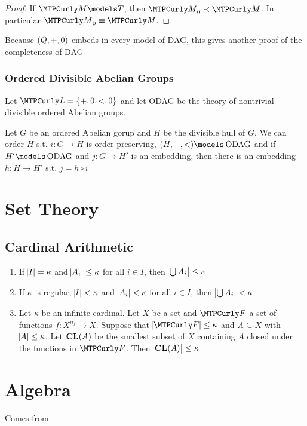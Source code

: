 \documentclass[11pt]{article}
\begin{document}
\begin{proof}
If \(\calm\models T\), then \(\calm_0\prec \calm\). In particular
\(\calm_0\equiv\calm\).
\end{proof}

Because \((\relax{Q},+,0)\) embeds in every model of DAG, this gives another proof
of the completeness of DAG

\subsubsection{Ordered Divisible Abelian Groups}
\label{sec:orga60839b}
Let \(\call=\{+,0,<,0\}\) and let ODAG be the theory of nontrivial divisible
ordered Abelian groups.

\begin{lemma}[]
Let \(G\) be an ordered Abelian gorup and \(H\) be the divisible hull of
\(G\). We can order \(H\) s.t. \(i:G\to H\) is order-preserving,
\((H,+,<)\models\ODAG\) and if \(H'\models\ODAG\) and \(j:G\to H'\) is an
embedding, then there is an embedding \(h:H\to H'\) s.t. \(j=h\circ i\)
\end{lemma}

\section{Set Theory}
\label{sec:org1dc85e9}
\subsection{Cardinal Arithmetic}
\label{sec:org27a01f5}
\begin{corollary}[]
\label{corA.15} 
\begin{enumerate}
\item If \(\abs{I}=\kappa\) and \(\abs{A_i}\le\kappa\) for all \(i\in I\), then 
\(\abs{\bigcup A_i}\le\kappa\)
\item If \(\kappa\) is regular, \(\abs{I}<\kappa\) and \(\abs{A_i}<\kappa\) for all 
\(i\in I\), then \(\abs{\bigcup A_i}<\kappa\)
\item Let \(\kappa\) be an infinite cardinal. Let \(X\) be a set and \(\calf\) a set of
functions \(f:X^{n_f}\to X\). Suppose that \(\abs{\calf}\le\kappa\) and
\(A\subseteq X\) with \(\abs{A}\le\kappa\). Let \(\operatorname{\textbf{CL}}(A)\) be the smallest
subset of \(X\) containing \(A\) closed under the functions in \(\calf\). Then 
\(\abs{\operatorname{\textbf{CL}}(A)}\le\kappa\)
\end{enumerate}
\end{corollary}
\section{Algebra}
\label{sec:orga7c5fab}
Comes from \cite{lang2005algebra}
\end{document}

